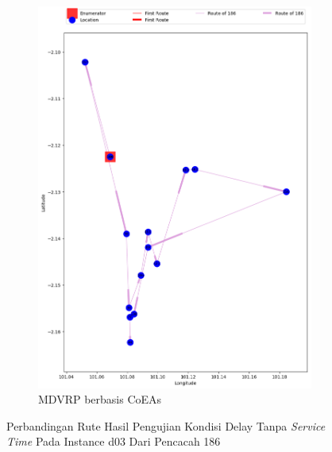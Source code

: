 \begin{figure}[H]
	\centering
	\begin{subfigure}[t]{\textwidth}
		\centering
		\includegraphics[width=\textwidth]{Resources/Images/delayed_3/real_m15_n100_delayed_3_186_coes}
		\caption{MDVRP berbasis CoEAs}
		\label{fig:real_m15_n100_delayed_3_186_coes}
	\end{subfigure}
	\caption{Perbandingan Rute Hasil Pengujian Kondisi Delay Tanpa \textit{Service Time} Pada Instance d03 Dari Pencacah 186}
	\label{fig:real_m15_n100_delayed_3_186}
\end{figure}


